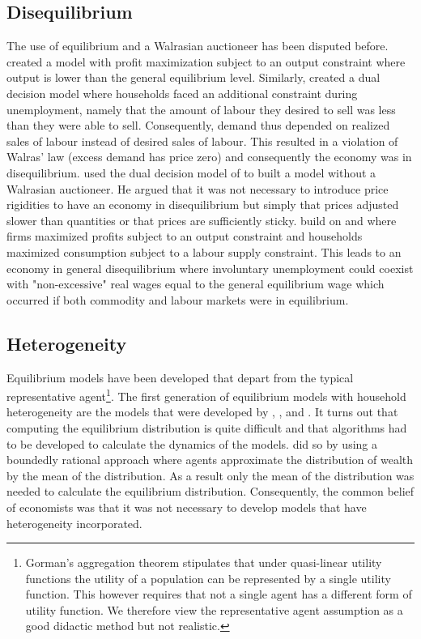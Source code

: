 \subsection{Disequilibrium}
The use of equilibrium and a Walrasian auctioneer has been disputed before. \cite{patinkin_involuntary_1949} created a model with profit maximization subject to an output constraint where output is lower than the general equilibrium level. Similarly, \cite{clower_keynesian_1969} created a dual decision model where households faced an additional constraint during unemployment, namely that the amount of labour they desired to sell was less than they were able to sell. Consequently, demand thus depended on realized sales of labour instead of desired sales of labour. This resulted in a violation of Walras' law (excess demand has price zero) and consequently the economy was in disequilibrium.  \cite{leijonhufvud_keynesian_1968} used the dual decision model of \cite{clower_keynesian_1969} to built a model without a Walrasian auctioneer. He argued that it was not necessary to introduce price rigidities to have an economy in disequilibrium but simply that prices adjusted slower than quantities or that prices are sufficiently sticky. \cite{barro_general_1971} build on \cite{patinkin_involuntary_1949} and \cite{clower_keynesian_1969} where firms maximized profits subject to an output constraint and households maximized consumption subject to a labour supply constraint. This leads to an economy in general disequilibrium where involuntary unemployment could coexist with "non-excessive" real wages equal to the general equilibrium wage which occurred if both commodity and labour markets were in equilibrium. 

\subsection{Heterogeneity}
Equilibrium models have been developed that depart from the typical representative agent\footnote{Gorman's aggregation theorem stipulates that under quasi-linear utility functions the utility of a population can be represented by a single utility function. This however requires that not a single agent has a different form of utility function. We therefore view the representative agent assumption as a good didactic method but not realistic.}. The first generation of equilibrium models with household heterogeneity are the models that were developed by \cite{bewley_stationary_1987}, \cite{huggett_risk-free_1993}, and \cite{aiyagari_uninsured_1994}. It turns out that computing the equilibrium distribution is quite difficult and that algorithms had to be developed to calculate the dynamics of the models. \cite{krusell_income_1998} did so by using a boundedly rational approach where agents approximate the distribution of wealth by the mean of the distribution. As a result only the mean of the distribution was needed to calculate the equilibrium distribution. Consequently, the common belief of economists was that it was not necessary to develop models that have heterogeneity incorporated. \\

